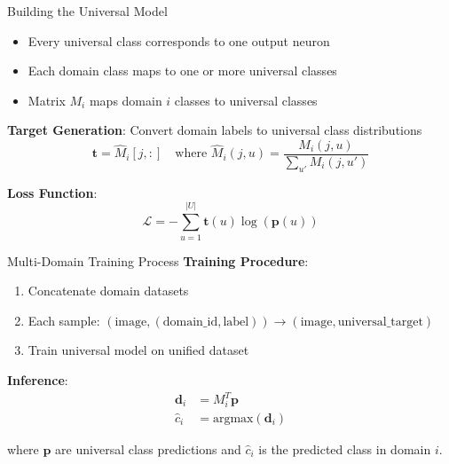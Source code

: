 \documentclass[aspectratio=169]{beamer}
\begin{document}
\begin{frame}{Building the Universal Model}

    \begin{itemize}
        \item Every universal class corresponds to one output neuron
        \item Each domain class maps to one or more universal classes
        \item Matrix $M_i$ maps domain $i$ classes to universal classes
    \end{itemize}

    \vspace{1em}

    \textbf{Target Generation}: Convert domain labels to universal class distributions
    \begin{equation}
        \mathbf{t} = \hat{M}_i[j, :] \quad \text{where } \hat{M}_i(j, u) = \frac{M_i(j, u)}{\sum_{u'} M_i(j, u')}
    \end{equation}

    \textbf{Loss Function}:
    \begin{equation}
        \mathcal{L} = -\sum_{u=1}^{|U|} \mathbf{t}(u) \log(\mathbf{p}(u))
    \end{equation}
\end{frame}

\begin{frame}{Multi-Domain Training Process}
    \textbf{Training Procedure}:
    \begin{enumerate}
        \item Concatenate domain datasets
        \item Each sample: $(\text{image}, (\text{domain\_id}, \text{label})) \rightarrow (\text{image}, \text{universal\_target})$
        \item Train universal model on unified dataset
    \end{enumerate}

    \vspace{1em}

    \textbf{Inference}:
    \begin{align}
        \mathbf{d}_i & = M_i^T \mathbf{p}            \\
        \hat{c}_i    & = \text{argmax}(\mathbf{d}_i)
    \end{align}

    where $\mathbf{p}$ are universal class predictions and $\hat{c}_i$ is the predicted class in domain $i$.
\end{frame}
\end{document}
